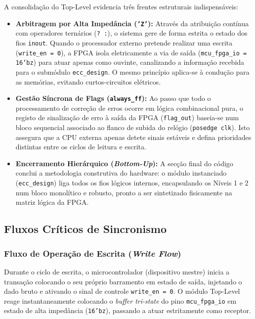 \documentclass[12pt,a4paper]{article}
\begin{document}
A consolidação do Top-Level evidencia três frentes estruturais indispensáveis:

\begin{itemize}
    \item \textbf{Arbitragem por Alta Impedância (\texttt{'Z'}):} Através da atribuição contínua com operadores ternários (\texttt{? :}), o sistema gere de forma estrita o estado dos fios \texttt{inout}. Quando o processador externo pretende realizar uma escrita (\texttt{write\_en = 0}), a FPGA isola eletricamente a via de saída (\texttt{mcu\_fpga\_io = 16'bz}) para atuar apenas como ouvinte, canalizando a informação recebida para o submódulo \texttt{ecc\_design}. O mesmo princípio aplica-se à condução para as memórias, evitando curtos-circuitos elétricos.
    \item \textbf{Gestão Síncrona de Flags (\texttt{always\_ff}):} Ao passo que todo o processamento de correção de erros ocorre em lógica combinacional pura, o registo de sinalização de erro à saída da FPGA (\texttt{flag\_out}) baseia-se num bloco sequencial associado ao flanco de subida do relógio (\texttt{posedge clk}). Isto assegura que a CPU externa apenas detete sinais estáveis e defina prioridades distintas entre os ciclos de leitura e escrita.
    \item \textbf{Encerramento Hierárquico (\textit{Bottom-Up}):} A secção final do código conclui a metodologia construtiva do hardware: o módulo instanciado (\texttt{ecc\_design}) liga todos os fios lógicos internos, encapsulando os Níveis 1 e 2 num bloco monolítico e robusto, pronto a ser sintetizado fisicamente na matriz lógica da FPGA.
\end{itemize}


\subsection{Fluxos Críticos de Sincronismo}

\subsubsection{Fluxo de Operação de Escrita (\textit{Write Flow})}
Durante o ciclo de escrita, o microcontrolador (dispositivo mestre) inicia a transação colocando o seu próprio barramento em estado de saída, injetando o dado bruto e ativando o sinal de controle \texttt{write\_en = 0}. O módulo Top-Level reage instantaneamente colocando o \textit{buffer tri-state} do pino \texttt{mcu\_fpga\_io} em estado de alta impedância (\texttt{16'bz}), passando a atuar estritamente como receptor.
\end{document}
